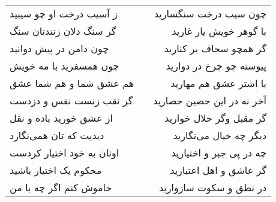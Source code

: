 \begin{center}
\begin{longtable}{l p{0.5cm} r}
ز آسیب درخت او چو سیبید
&&
چون سیب درخت سنگسارید
\\
گر سنگ دلان زنندتان سنگ
&&
با گوهر خویش یار غارید
\\
چون دامن در پیش دوانید
&&
گر همچو سجاف بر کنارید
\\
چون همسفرید با مه خویش
&&
پیوسته چو چرخ در دوارید
\\
هم عشق شما و هم شما عشق
&&
با اشتر عشق هم مهارید
\\
گر نقب زنست نفس و دزدست
&&
آخر نه در این حصین حصارید
\\
از عشق خورید باده و نقل
&&
گر مقبل وگر حلال خوارید
\\
دیدیت که تان همی‌نگارد
&&
دیگر چه خیال می‌نگارید
\\
اوتان به خود اختیار کردست
&&
چه در پی جبر و اختیارید
\\
محکوم یک اختیار باشید
&&
گر عاشق و اهل اعتبارید
\\
خاموش کنم اگر چه با من
&&
در نطق و سکوت سازوارید
\\
\end{longtable}
\end{center}
